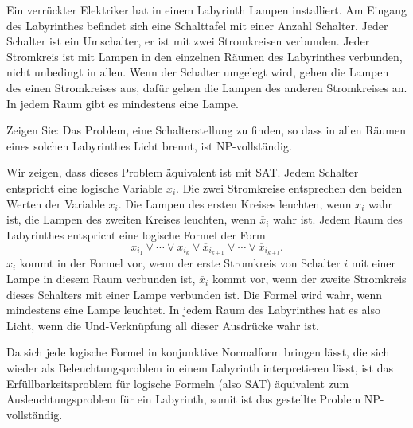 Ein verrückter Elektriker hat in einem Labyrinth Lampen installiert.
Am Eingang des Labyrinthes befindet sich eine Schalttafel mit einer
Anzahl Schalter. Jeder Schalter ist ein Umschalter, er ist mit
zwei Stromkreisen verbunden. Jeder Stromkreis ist mit Lampen in
den einzelnen Räumen des Labyrinthes verbunden, nicht unbedingt in
allen.
Wenn der
Schalter umgelegt wird, gehen die Lampen des einen
Stromkreises aus, dafür gehen die Lampen des anderen Stromkreises an.
In jedem Raum gibt es mindestens eine Lampe.

Zeigen Sie: Das Problem, eine Schalterstellung zu finden, so
dass in allen Räumen eines solchen Labyrinthes Licht brennt,
ist NP-vollständig.

\begin{loesung}
Wir zeigen, dass dieses Problem äquivalent ist mit SAT. Jedem Schalter
entspricht eine logische Variable $x_i$. Die zwei Stromkreise entsprechen
den beiden Werten der Variable $x_i$. Die Lampen des ersten Kreises leuchten,
wenn $x_i$ wahr ist, die Lampen des zweiten Kreises leuchten, wenn
$\overline x_i$ wahr ist.
Jedem Raum des Labyrinthes entspricht eine logische Formel der Form
\[
x_{i_1}\vee \cdots \vee x_{i_k}\vee \overline x_{i_{k+1}}\vee \cdots\vee \overline x_{i_{k+l}}.
\]
$x_i$ kommt in der Formel vor, wenn der erste Stromkreis von Schalter $i$
mit einer Lampe in diesem Raum verbunden ist, $\overline x_i$ kommt vor,
wenn der zweite Stromkreis dieses Schalters mit einer Lampe verbunden ist.
Die Formel wird wahr, wenn mindestens eine Lampe leuchtet. In jedem Raum
des Labyrinthes hat es also Licht, wenn die Und-Verknüpfung all dieser
Ausdrücke wahr ist.

Da sich jede logische Formel in konjunktive Normalform bringen lässt,
die sich wieder als Beleuchtungsproblem in einem Labyrinth interpretieren
lässt, ist das Erfüllbarkeitsproblem für logische Formeln (also SAT)
äquivalent zum Ausleuchtungsproblem für ein Labyrinth, somit ist
das gestellte Problem NP-vollständig.
\end{loesung}
